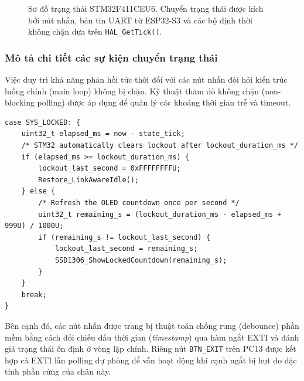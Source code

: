 \begin{figure}[!htbp]
{}
  \caption[Sơ đồ trạng thái hệ thống STM32F411CEU6]{Sơ đồ trạng thái STM32F411CEU6. Chuyển trạng thái được kích bởi nút nhấn, bản tin UART từ ESP32-S3 và các bộ định thời không chặn dựa trên \texttt{HAL\_GetTick()}.}
  \label{fig:stm32_fsm}
\end{figure}

\subsubsection{Mô tả chi tiết các sự kiện chuyển trạng thái}

Việc duy trì khả năng phản hồi tức thời đối với các nút nhấn đòi hỏi kiến trúc luồng chính (main loop) không bị chặn. Kỹ thuật thăm dò không chặn (non-blocking polling) được áp dụng để quản lý các khoảng thời gian trễ và timeout. 

\begin{lstlisting}[style=cstyle, caption={Xử lý đếm ngược chế độ khóa an ninh (Security Lockout)}, label={lst:lockout_code}]
case SYS_LOCKED: {
    uint32_t elapsed_ms = now - state_tick;
    /* STM32 automatically clears lockout after lockout_duration_ms */
    if (elapsed_ms >= lockout_duration_ms) {
        lockout_last_second = 0xFFFFFFFFU;
        Restore_LinkAwareIdle(); 
    } else {
        /* Refresh the OLED countdown once per second */
        uint32_t remaining_s = (lockout_duration_ms - elapsed_ms + 999U) / 1000U;
        if (remaining_s != lockout_last_second) {
            lockout_last_second = remaining_s;
            SSD1306_ShowLockedCountdown(remaining_s);
        }
    }
    break;
}
\end{lstlisting}

Bên cạnh đó, các nút nhấn được trang bị thuật toán chống rung (debounce) phần mềm bằng cách đối chiếu dấu thời gian (\textit{timestamp}) qua hàm ngắt EXTI và đánh giá trạng thái ổn định ở vòng lặp chính. Riêng nút \texttt{BTN\_EXIT} trên PC13 được kết hợp cả EXTI lẫn polling dự phòng để vẫn hoạt động khi cạnh ngắt bị hụt do đặc tính phần cứng của chân này.


